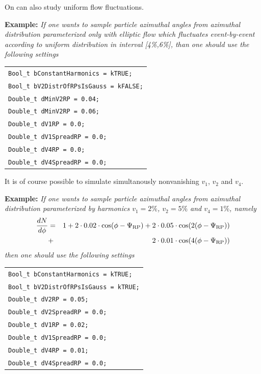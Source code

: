 \documentclass[a4paper]{book}
\numberwithin{equation}{subsection}
\begin{document}
\noindent On can also study uniform flow fluctuations.

\vspace{0.5cm}
\noindent\textbf{Example:} \textit{If one wants to sample particle azimuthal angles from azimuthal distribution parameterized only with elliptic flow which fluctuates event-by-event according to uniform distribution in interval [4\%,6\%], than one should use the following settings}
%
\begin{center}
\begin{tabular}[t]{l}
\texttt{Bool\_t bConstantHarmonics = kTRUE;} \\
\texttt{Bool\_t bV2DistrOfRPsIsGauss = kFALSE;} \\
\texttt{Double\_t dMinV2RP = 0.04;} \\
\texttt{Double\_t dMinV2RP = 0.06;} \\
\texttt{Double\_t dV1RP = 0.0;} \\
\texttt{Double\_t dV1SpreadRP = 0.0;} \\
\texttt{Double\_t dV4RP = 0.0;} \\
\texttt{Double\_t dV4SpreadRP = 0.0;}
\end{tabular}
\end{center}
%
\vspace{0.5cm}

\noindent It is of course possible to simulate simultanously nonvanishing $v_1$, $v_2$ and $v_4$. 


\vspace{0.5cm}
\noindent\textbf{Example:} \textit{If one wants to sample particle azimuthal angles from azimuthal distribution parameterized by harmonics $v_1=2\%$, $v_2=5\%$ and $v_4=1\%$, namely}
%
\begin{eqnarray}
\frac{dN}{d\phi} &=& 1+2\cdot 0.02\cdot\cos(\phi-\Psi_{\rm RP})+2\cdot 0.05\cdot\cos(2(\phi-\Psi_{\rm RP}))\nonumber\\
&+&2\cdot 0.01\cdot\cos(4(\phi-\Psi_{\rm RP}))
\end{eqnarray}
%
\textit{then one should use the following settings}
%
\begin{center}
\begin{tabular}[t]{l}
\texttt{Bool\_t bConstantHarmonics = kTRUE;} \\
\texttt{Bool\_t bV2DistrOfRPsIsGauss = kTRUE;} \\
\texttt{Double\_t dV2RP = 0.05;} \\
\texttt{Double\_t dV2SpreadRP = 0.0;} \\
\texttt{Double\_t dV1RP = 0.02;} \\
\texttt{Double\_t dV1SpreadRP = 0.0;} \\
\texttt{Double\_t dV4RP = 0.01;} \\
\texttt{Double\_t dV4SpreadRP = 0.0;}
\end{tabular}
\end{center}
%
\vspace{0.5cm}
\end{document}
